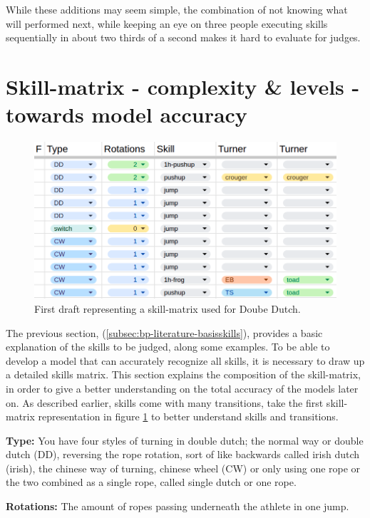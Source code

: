 While these additions may seem simple, the combination of not knowing what will performed next, while keeping an eye on three people executing skills sequentially in about two thirds of a second makes it hard to evaluate for judges.

\section{Skill-matrix - complexity \& levels - towards model accuracy}
\label{lit:skill-matrix}

\begin{figure}
    \centering
    \includegraphics[width=0.95\linewidth]{img/doubledutch-matrix}
    \caption[skill-matrix-DD]{First draft representing a skill-matrix used for Doube Dutch.}
    \label{fig:doubledutch-skill-matrix}
\end{figure}

The previous section, (\ref{subsec:bp-literature-basisskills}), provides a basic explanation of the skills to be judged, along some examples. To be able to develop a model that can accurately recognize all skills, it is necessary to draw up a detailed skills matrix. This section explains the composition of the skill-matrix, in order to give a better understanding on the total accuracy of the models later on. As described earlier, skills come with many transitions, take the first skill-matrix representation in figure \ref{fig:doubledutch-skill-matrix} to better understand skills and transitions.

\textbf{Type:} You have four styles of turning in double dutch; the normal way or double dutch (DD), reversing the rope rotation, sort of like backwards called irish dutch (irish), the chinese way of turning, chinese wheel (CW) or only using one rope or the two combined as a single rope, called single dutch or one rope.

\textbf{Rotations:} The amount of ropes passing underneath the athlete in one jump.

